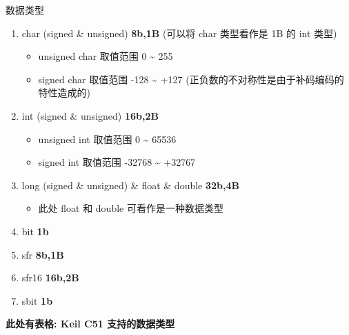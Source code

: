 \documentclass{beamer}
\begin{document}
\begin{frame}{数据类型}
    \begin{enumerate}
        \item
            char (signed \& unsigned) \textbf{8b,1B} (可以将 char 类型看作是 1B 的
            int 类型)
            \pause

            \begin{itemize}
                \item
                    unsigned char 取值范围 0 \textasciitilde{} 255
                \item
                    signed char 取值范围 -128 \textasciitilde{} +127
                    (正负数的不对称性是由于补码编码的特性造成的)
            \end{itemize}
            \pause
        \item
            int (signed \& unsigned) \textbf{16b,2B}

            \pause
            \begin{itemize}
                \item
                    unsigned int 取值范围 0 \textasciitilde{} 65536
                \item
                    signed int 取值范围 -32768 \textasciitilde{} +32767
                    \pause
            \end{itemize}
        \item
            long (signed \& unsigned) \& float \& double \textbf{32b,4B}

            \begin{itemize}
                \item
                    此处 float 和 double 可看作是一种数据类型
            \end{itemize}
            \pause
        \item
            bit \textbf{1b}
        \item
            sfr \textbf{8b,1B}
        \item
            sfr16 \textbf{16b,2B}
        \item
            sbit \textbf{1b}
    \end{enumerate}

    \textbf{此处有表格: Keil C51 支持的数据类型}
\end{frame}
\end{document}
